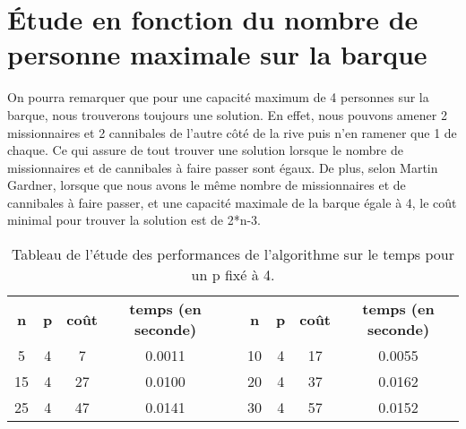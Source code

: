\documentclass[a4paper, 12pt, french,oneside]{book}
\begin{document}
\section{Étude en fonction du nombre de personne maximale sur la barque}
On pourra remarquer que pour une capacité maximum de 4 personnes sur la barque, nous trouverons toujours une solution. En effet, nous pouvons amener 2 missionnaires et 2 cannibales de l'autre côté de la rive puis n'en ramener que 1 de chaque. Ce qui assure de tout trouver une solution lorsque le nombre de missionnaires et de cannibales à faire passer sont égaux. De plus, selon Martin Gardner, lorsque que nous avons le même nombre de missionnaires et de cannibales à faire passer, et une capacité maximale de la barque égale à 4, le coût minimal pour trouver la solution est de 2*n-3.
\begin{table}[!ht]
    \caption{Tableau de l'étude des performances de l'algorithme sur le temps pour un p fixé à 4. }
    \renewcommand\arraystretch{1.2}
    \begin{tabularx}{\linewidth}{|c|c|c|c|X|c|c|c|c|}
        \cline{1-4}\cline{6-9}
        {\textbf{n}} & {\textbf{p}} & {\textbf{coût}} & {\textbf{temps (en seconde)}} &  & {\textbf{n}} & {\textbf{p}} & {\textbf{coût}} & {\textbf{temps (en seconde)}} \\
        \cline{1-4}\cline{6-9}


        5            & 4            & 7               & 0.0011                        &  &

        10           & 4            & 17              & 0.0055                                                                                                           \\

        15           & 4            & 27              & 0.0100                        &  &

        20           & 4            & 37              & 0.0162                                                                                                           \\

        25           & 4            & 47              & 0.0141                        &  &

        30           & 4            & 57              & 0.0152                                                                                                           \\


\end{tabularx}
\end{table}
\end{document}

